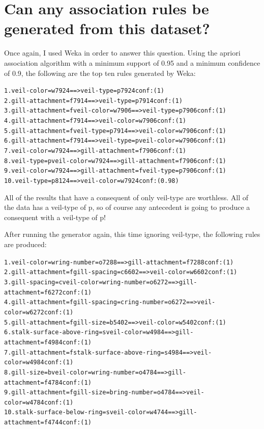 \documentclass[margin,letterpaper,11pt]{scrartcl}
\begin{document}
\section{Can any association rules be generated from this dataset?}

Once again, I used Weka in order to answer this question. Using the apriori
association algorithm with a minimum support of 0.95 and a minimum confidence
of 0.9, the following are the top ten rules generated by Weka:
\begin{alltt}
 1. veil-color=w 7924 ==> veil-type=p 7924    conf:(1)
 2. gill-attachment=f 7914 ==> veil-type=p 7914    conf:(1)
 3. gill-attachment=f veil-color=w 7906 ==> veil-type=p 7906    conf:(1)
 4. gill-attachment=f 7914 ==> veil-color=w 7906    conf:(1)
 5. gill-attachment=f veil-type=p 7914 ==> veil-color=w 7906    conf:(1)
 6. gill-attachment=f 7914 ==> veil-type=p veil-color=w 7906    conf:(1)
 7. veil-color=w 7924 ==> gill-attachment=f 7906    conf:(1)
 8. veil-type=p veil-color=w 7924 ==> gill-attachment=f 7906    conf:(1)
 9. veil-color=w 7924 ==> gill-attachment=f veil-type=p 7906    conf:(1)
10. veil-type=p 8124 ==> veil-color=w 7924    conf:(0.98)
\end{alltt}

All of the results that have a consequent of only veil-type are worthless. All
of the data has a veil-type of p, so of course any antecedent is going to
produce a consequent with a veil-type of p!

After running the generator again, this time ignoring veil-type, the following
rules are produced:
\begin{alltt}
 1. veil-color=w ring-number=o 7288 ==> gill-attachment=f 7288    conf:(1)
 2. gill-attachment=f gill-spacing=c 6602 ==> veil-color=w 6602    conf:(1)
 3. gill-spacing=c veil-color=w ring-number=o 6272 ==> gill-attachment=f 6272    conf:(1)
 4. gill-attachment=f gill-spacing=c ring-number=o 6272 ==> veil-color=w 6272    conf:(1)
 5. gill-attachment=f gill-size=b 5402 ==> veil-color=w 5402    conf:(1)
 6. stalk-surface-above-ring=s veil-color=w 4984 ==> gill-attachment=f 4984    conf:(1)
 7. gill-attachment=f stalk-surface-above-ring=s 4984 ==> veil-color=w 4984    conf:(1)
 8. gill-size=b veil-color=w ring-number=o 4784 ==> gill-attachment=f 4784    conf:(1)
 9. gill-attachment=f gill-size=b ring-number=o 4784 ==> veil-color=w 4784    conf:(1)
10. stalk-surface-below-ring=s veil-color=w 4744 ==> gill-attachment=f 4744    conf:(1)
\end{alltt}
\end{document}
